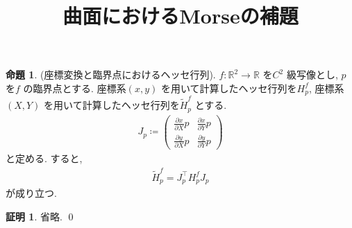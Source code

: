 \documentclass[10pt, fleqn, label-section=none]{bxjsarticle}
\title{曲面におけるMorseの補題}
\date{}
\author{}
\theoremstyle{definition}
\newtheorem{prop}[dfn]{命題}
\newtheorem*{pf*}{証明}
\renewcommand{\;}{\, ; \,}
\newcommand{\gyouretsu}[1]{\begin{pmatrix} #1 \end{pmatrix} }
\begin{document}
\maketitle

\section{}

\begin{prop}(座標変換と臨界点におけるヘッセ行列). $f: \mathbb R^2 \rightarrow \mathbb R$ を$C^2$ 級写像とし, $p$ を$f$ の臨界点とする. 座標系$(x,y)$ を用いて計算したヘッセ行列を$H^f_p$, 座標系$(X,Y)$ を用いて計算したヘッセ行列を$\tilde H^f_p$ とする. 
\begin{align*} J_{p} \coloneqq \gyouretsu{ \frac{\partial x}{\partial X} p& \frac{\partial x}{\partial Y} p \\ \frac{ \partial y}{\partial X}p &  \frac{ \partial y}{\partial Y} p  }\end{align*} 
と定める. すると, 
\begin{align*} \tilde H ^f _p = J_p ^ {\top} H^f _p J_p  \end{align*}  
が成り立つ.
\end{prop}
\begin{pf*}
省略.
\qed
\end{pf*}
\end{document}
